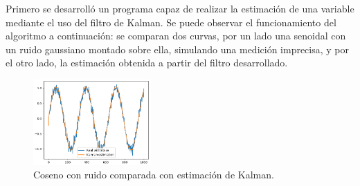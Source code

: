Primero se desarrolló un programa capaz de realizar la estimación de una variable mediante el uso del filtro de Kalman. Se puede observar el funcionamiento del algoritmo a continuación: se comparan dos curvas, por un lado una senoidal con un ruido gaussiano montado sobre ella, simulando una medición imprecisa, y por el otro lado, la estimación obtenida a partir del filtro desarrollado.
\begin{figure}[H]
\centering
	\includegraphics[width=0.4\textwidth]{Imagenes/Kalman_test_1.png}
	\caption{Coseno con ruido comparada con estimación de Kalman.}
	\label{fig:kalman-comp}
\end{figure}

